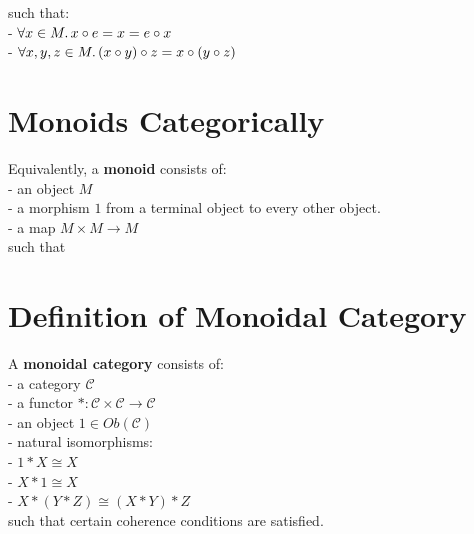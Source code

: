 \documentclass[a4paper, twoside, english, 11pt]{book}
\newcommand{\C}{\mathcal C}
\begin{document}
\noindent
such that: \\

- $\forall x \in M \ldotp x \circ e = x = e \circ x$ \\

- $\forall x, y, z \in M \ldotp (x \circ y) \circ z = x \circ (y \circ z)$



\section{Monoids Categorically}

Equivalently, a \textbf{monoid} consists of: \\

- an object $M$ \\

- a morphism $1$ from a terminal object to every other object. \\ %

- a map $M \times M \rightarrow M$ \\

such that %



\section{Definition of Monoidal Category}

A \textbf{monoidal category} consists of: \\

- a category $\C$ \\

- a functor $* : \C \times \C \rightarrow \C$ \\

- an object $1 \in Ob(\C)$ \\ %

- natural isomorphisms: \\

\indent\indent
- $1 * X \cong X$ \\

\indent\indent
- $X * 1 \cong X$ \\

\indent\indent
- $X * (Y * Z) \cong (X * Y) * Z$ \\

\noindent
such that certain coherence conditions are satisfied. \\
\end{document}
